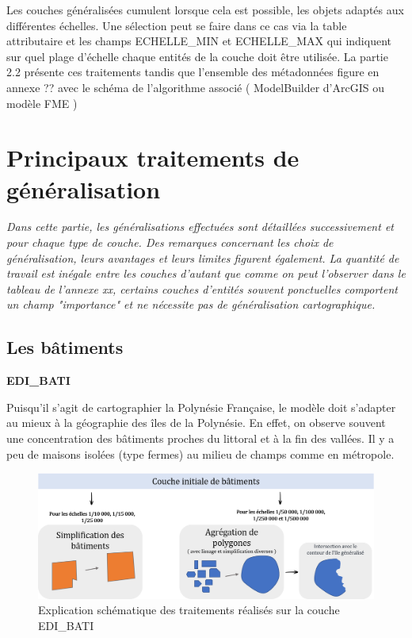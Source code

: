 Les couches généralisées cumulent lorsque cela est possible, les objets adaptés aux différentes échelles. 
Une sélection peut se faire dans ce cas via la table attributaire et les champs ECHELLE\_MIN et ECHELLE\_MAX qui indiquent sur quel plage d'échelle chaque entités de la couche doit être utilisée.
La partie 2.2 présente ces traitements tandis que l'ensemble des métadonnées figure en annexe
 ?? avec le schéma de l'algorithme associé ( ModelBuilder d'ArcGIS ou modèle FME )



\section{Principaux traitements de généralisation}

\textit{Dans cette partie, les généralisations effectuées sont détaillées successivement et pour chaque type de couche. Des remarques concernant les choix de généralisation, leurs avantages et leurs limites figurent également. La quantité de travail est inégale entre les couches d'autant que comme on peut l'observer dans le tableau de l'annexe xx, certains couches d'entités souvent ponctuelles comportent un champ "importance" et ne nécessite pas de généralisation cartographique.}

\subsection{Les bâtiments}
\begin{center}
    \footnotesize
    \textbf{EDI\_BATI}
\end{center}
Puisqu'il s'agit de cartographier la Polynésie Française, le modèle doit s'adapter au mieux à la géographie des îles de la Polynésie. En effet, on observe souvent une concentration des bâtiments proches du littoral et à la fin des vallées. Il y a peu de maisons isolées (type fermes) au milieu de champs comme en métropole.

\begin{figure}[ht]
\centering
\includegraphics[width=\linewidth]{images/chap1/batiment_mb.png}
\caption{Explication schématique des traitements réalisés sur la couche EDI\_BATI}
\label{bati_mb}
\end{figure}

